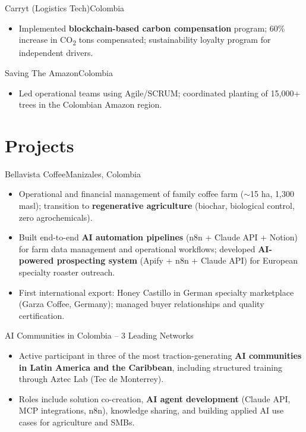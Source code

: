 \documentclass[11pt,a4paper,sans]{moderncv}
\begin{document}
%
{Carryt (Logistics Tech)}{Colombia}{}{%
\begin{itemize}
  \item Implemented \textbf{blockchain-based carbon compensation} program; 60\% increase
        in CO\textsubscript{2} tons compensated; sustainability loyalty program for
        independent drivers.
\end{itemize}}

%
{Saving The Amazon}{Colombia}{}{%
\begin{itemize}
  \item Led operational teams using Agile/SCRUM; coordinated planting of 15,000+ trees
        in the Colombian Amazon region.
\end{itemize}}

\section{Projects}

%
{Bellavista Coffee}{Manizales, Colombia}{}{%
\begin{itemize}
  \item Operational and financial management of family coffee farm ($\sim$15 ha, 1,300
        masl); transition to \textbf{regenerative agriculture} (biochar, biological
        control, zero agrochemicals).
  \item Built end-to-end \textbf{AI automation pipelines} (n8n + Claude API + Notion)
        for farm data management and operational workflows; developed \textbf{AI-powered
        prospecting system} (Apify + n8n + Claude API) for European specialty roaster
        outreach.
  \item First international export: Honey Castillo in German specialty marketplace
        (Garza Coffee, Germany); managed buyer relationships and quality certification.
\end{itemize}}

%
{AI Communities in Colombia -- 3 Leading Networks}{}{}{%
\begin{itemize}
  \item Active participant in three of the most traction-generating \textbf{AI communities
        in Latin America and the Caribbean}, including structured training through
        Aztec Lab (Tec de Monterrey).
  \item Roles include solution co-creation, \textbf{AI agent development}
        (Claude API, MCP integrations, n8n), knowledge sharing, and building applied
        AI use cases for agriculture and SMBs.
\end{itemize}}
\end{document}
